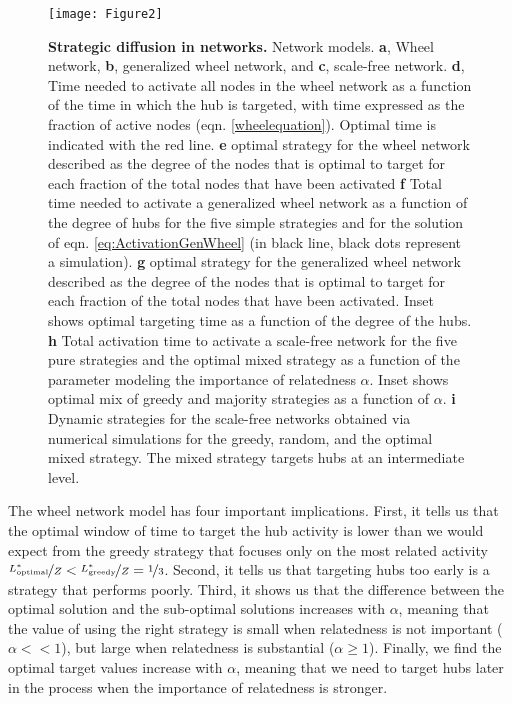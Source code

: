 \documentclass[preprint,superscriptaddress,floatfix]{article}
\begin{document}
\begin{figure}
    \centering
    \texttt{[image: Figure2]}
    \caption{\textbf{Strategic diffusion in networks.} Network models. \textbf{a}, Wheel network, \textbf{b}, generalized wheel network, and \textbf{c}, scale-free network. \textbf{d}, Time needed to activate all nodes in the wheel network as a function of the time in which the hub is targeted, with time expressed as the fraction of active nodes (eqn. \ref{wheelequation}). Optimal time is indicated with the red line. \textbf{e} optimal strategy for the wheel network described as the degree of the nodes that is optimal to target for each fraction of the total nodes that have been activated \textbf{f} Total time needed to activate a generalized wheel network as a function of the degree of hubs for the five simple strategies and for the solution of eqn. \ref{eq:ActivationGenWheel} (in black line, black dots represent a simulation). \textbf{g} optimal strategy for the generalized wheel network described as the degree of the nodes that is optimal to target for each fraction of the total nodes that have been activated. Inset shows optimal targeting time as a function of the degree of the hubs. \textbf{h} Total activation time to activate a scale-free network for the five pure strategies and the optimal mixed strategy as a function of the parameter modeling the importance of relatedness $\alpha$. Inset shows optimal mix of greedy and majority strategies as a function of $\alpha$. \textbf{i} Dynamic strategies for the scale-free networks obtained via numerical simulations for the greedy, random, and the optimal mixed strategy. The mixed strategy targets hubs at an intermediate level.}
    \label{fig:topologies}
\end{figure}

The wheel network model has four important implications. First, it tells us that the optimal window of time to target the hub activity is lower than we would expect from the greedy strategy that focuses only on the most related activity $\nicefrac{L^\ast_{\textrm{optimal}}}{Z} < \nicefrac{L^\ast_{\textrm{greedy}}}{Z}=\nicefrac{1}{3}$. Second, it tells us that targeting hubs too early is a strategy that performs poorly. Third, it shows us that the difference between the optimal solution and the sub-optimal solutions increases with $\alpha$, meaning that the value of using the right strategy is small when relatedness is not important ($\alpha<<1$), but large when relatedness is substantial ($\alpha\geq1$). Finally, we find the optimal target values increase with $\alpha$, meaning that we need to target hubs later in the process when the importance of relatedness is stronger. 
\end{document}
